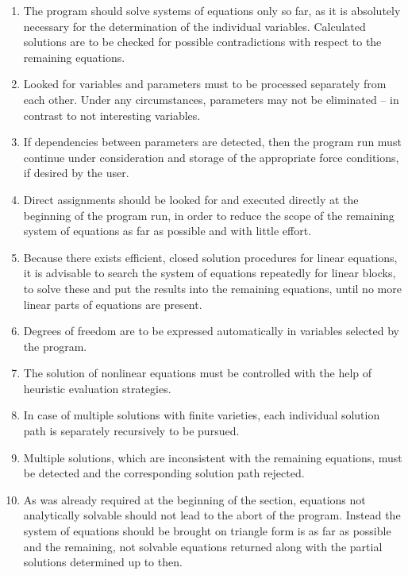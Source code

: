 \begin{enumerate}
\item The program should solve systems of equations only so far, as it is absolutely necessary for the determination of the individual variables. Calculated solutions are to be checked for possible contradictions with respect to the remaining equations.

\item 
Looked for variables and parameters must to be processed separately from each other.  Under any circumstances, parameters may not be  eliminated -- in contrast to not interesting variables.

\item If dependencies between parameters are detected, then the program run must continue under consideration and storage of the appropriate force conditions, if desired by the user.

\item \label{AnfImmed}
Direct assignments should be looked for  and executed directly at the beginning of the program run, in order to reduce the scope of the remaining system of equations as far as possible and with little effort.

\item \label{AnfLinear}
Because there exists  efficient, closed solution procedures for linear equations, it is advisable to search the system of equations repeatedly for linear blocks, to solve these and put the results into the remaining  equations, until no more linear parts of equations are present.

\item 
Degrees of freedom are to be expressed automatically in variables selected by the program.

\item \label{AnfNonlinear}
The solution of nonlinear equations must be controlled with the help of heuristic evaluation strategies.

\item 
In case of multiple solutions with finite varieties, each individual solution path is separately recursively to be pursued.

\item 
Multiple solutions, which are inconsistent with the remaining equations, must be detected and the corresponding solution path rejected.

\item 
As was already required at the beginning of the section,  equations not analytically solvable should not lead to the abort of the program. Instead the system of equations should be brought  on triangle form is as far as possible  and the  remaining, not solvable equations returned along with the partial solutions determined up to then.

\end{enumerate}


